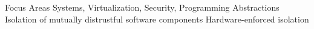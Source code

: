 


\begin{cvskills}

\cvskill
{Focus Areas}
{Systems, Virtualization, Security, Programming Abstractions\linebreak 
  Isolation of mutually distrustful software components\linebreak
  Hardware-enforced isolation\linebreak
}

\end{cvskills}

